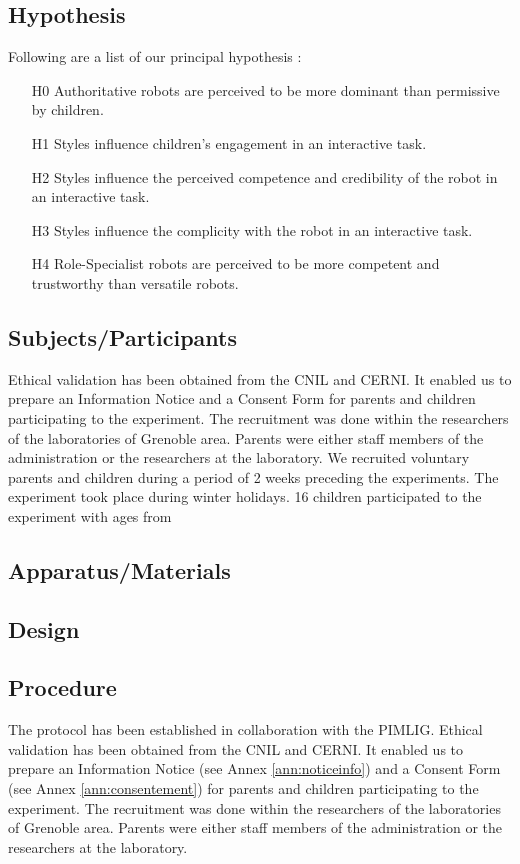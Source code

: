 \documentclass[smallextended]{svjour3}
\begin{document}
\subsection{Hypothesis}
Following are a list of our principal hypothesis :
\begin{itemize}[noitemsep,nolistsep]
	\item[H0] Authoritative robots are perceived to be more dominant than permissive by children.
	\item[H1] Styles influence children's engagement in an interactive task.
	\item[H2] Styles influence the perceived competence and credibility of the robot in an interactive task.
	\item[H3] Styles influence the complicity with the robot in an interactive task.
	\item[H4] Role-Specialist robots are perceived to be more competent and trustworthy than versatile robots.
\end{itemize}

\subsection{Subjects/Participants}
Ethical validation has been obtained from the CNIL and CERNI.
It enabled us to prepare an Information Notice and a Consent Form for parents and children participating to the experiment.
The recruitment was done within the researchers of the laboratories of Grenoble area. 
Parents were either staff members of the administration or the researchers at the laboratory.
We recruited voluntary parents and children during a period of 2 weeks preceding the experiments. 
The experiment took place during winter holidays. 
16 children participated to the experiment with ages from 


\subsection{Apparatus/Materials}
\subsection{Design}
\subsection{Procedure}
The protocol has been established in collaboration with the PIMLIG.
Ethical  validation has been obtained from the CNIL and CERNI.
It enabled us to prepare an Information Notice (see Annex \ref{ann:noticeinfo}) and a Consent Form  (see Annex \ref{ann:consentement}) for parents and children participating to the experiment.
The recruitment was done within the researchers of the laboratories of Grenoble area. 
Parents were either staff members of the administration or the researchers at the laboratory.
\end{document}
